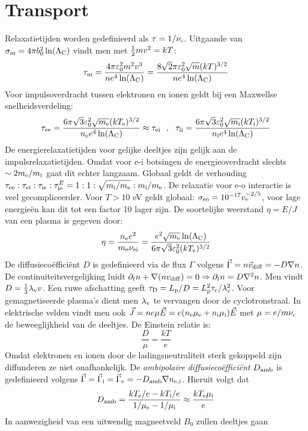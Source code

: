 \section{Transport}
Relaxatietijden worden gedefinieerd als $\tau=1/\nu_{\rm c}$. Uitgaande van
$\sigma_{\rm m}=4\pi b_0^2\ln(\Lambda_{\rm C})$ vindt men met $\half mv^2=kT$:
\[
\tau_{\rm m}=\frac{4\pi\varepsilon_0^2m^2v^3}{ne^4\ln(\Lambda_{\rm C})}=
\frac{8\sqrt{2}\pi\varepsilon_0^2\sqrt{m}(kT)^{3/2}}{ne^4\ln(\Lambda_{\rm C})}
\]
Voor impulsoverdracht tussen elektronen en ionen geldt bij een Maxwellse
snelheidsverdeling:
\[
\tau_{\rm ee}=\frac{6\pi\sqrt{3}\varepsilon_0^2\sqrt{\me}(k\Te)^{3/2}}{\ne e^4\ln(\Lambda_{\rm C})}\approx\tau_{\rm ei}~~,~~
\tau_{\rm ii}=\frac{6\pi\sqrt{3}\varepsilon_0^2\sqrt{\mi}(k\Ti)^{3/2}}{\ni e^4\ln(\Lambda_{\rm C})}
\]
De energierelaxatietijden voor gelijke deeltjes zijn gelijk aan de
impulsrelaxatietijden. Omdat voor e-i botsingen de energieoverdracht slechts
$\sim2\me/\mi$ gaat dit echter langzaam. Globaal geldt de verhouding
$\tau_{\rm ee}:\tau_{\rm ei}:\tau_{\rm ie}:\tau_{\rm ie}^E=1:1:\sqrt{\mi/\me}:\mi/\me$.
\npar
De relaxatie voor e-o interactie is veel gecompliceerder. Voor $T>10$ eV
geldt globaal: $\sigma_{\rm eo}=10^{-17}v_{\rm e}^{-2/5}$, voor lage
energie\"en kan dit tot een factor 10 lager zijn.
\npar
De soortelijke weerstand $\eta=E/J$ van een plasma is gegeven door:
\[
\eta=\frac{\ne e^2}{\me\nu_{\rm ei}}=\frac{e^2\sqrt{\me}\ln(\Lambda_{\rm C})}{6\pi\sqrt{3}\varepsilon_0^2(k\Te)^{3/2}}
\]
De diffusieco\"effici\"ent $D$ is gedefinieerd via de flux $\Gamma$ volgens
$\vec{\Gamma}=n\vv_{\rm diff}=-D\nabla n$. De continuiteitsvergelijking
luidt $\partial_tn+\nabla(nv_{\rm diff})=0\Rightarrow\partial_tn=D\nabla^2n$.
Men vindt $D=\frac{1}{3}\lambda_{\rm v}v$. Een ruwe afschatting geeft
$\tau_{\rm D}=L_{\rm p}/D=L_{\rm p}^2\tau_{\rm c}/\lambda_{\rm v}^2$. Voor
gemagnetiseerde plasma's dient men $\lambda_{\rm v}$ te vervangen door de
cyclotronstraal. In elektrische velden vindt men ook
$\vec{J}=ne\mu\vec{E}=e(\ne\mu_{\rm e}+\ni\mu_{\rm i})\vec{E}$ met
$\mu=e/m\nu_{\rm c}$ de beweeglijkheid van de deeltjes. De Einstein relatie
is:
\[
\frac{D}{\mu}=\frac{kT}{e}
\]
Omdat elektronen en ionen door de ladingsneutraliteit sterk gekoppeld zijn
diffunderen ze niet onafhankelijk. De {\it ambipolaire
diffusieco\"effici\"ent} $D_{\rm amb}$ is gedefinieerd volgens
$\vec{\Gamma}=\vec{\Gamma}_{\rm i}=\vec{\Gamma}_{\rm e}=-D_{\rm amb}\nabla n_{\rm e,i}$.
Hieruit volgt dat
\[
D_{\rm amb}=\frac{k\Te/e-k\Ti/e}{1/\mu_{\rm e}-1/\mu_{\rm i}}\approx\frac{k\Te\mu_{\rm i}}{e}
\]
In aanwezigheid van een uitwendig magneetveld $B_0$ zullen deeltjes gaan
